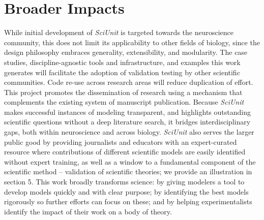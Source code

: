 \documentclass[11pt,letterpaper]{article}
\begin{document}
\section{Broader Impacts}
While initial development of \textit{SciUnit} is targeted towards the neuroscience community, this does not limit its applicability to other fields of biology, since the design philosophy embraces generality, extensibility, and modularity. 
The case studies, discipline-agnostic tools and infrastructure, and examples this work generates will facilitate the adoption of validation testing by other scientific communities.  
Code re-use across research areas will reduce duplication of effort.  
This project promotes the dissemination of research using a mechanism that complements the existing system of manuscript publication.  
Because \textit{SciUnit} makes successful instances of modeling transparent, and highlights outstanding scientific questions without a deep literature search, it bridges interdisciplinary gaps, both within neuroscience and across biology. 
\textit{SciUnit} also serves the larger public good by providing journalists and educators with an expert-curated resource where contributions of different scientific models are easily identified without expert training, as well as a window to a fundamental component of the scientific method – validation of scientific theories; we provide an illustration in section 5.  
This work broadly transforms science: by giving modelers a tool to develop models quickly and with clear purpose; 
by identifying the best models rigorously so further efforts can focus on these; and by helping experimentalists identify the impact of their work on a body of theory.
\end{document}
